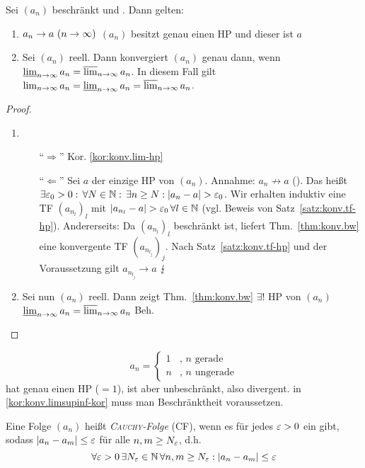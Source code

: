 \documentclass[12pt]{scrreprt}
\begin{document}
\begin{kor}
  \label{kor:konv.limsupinf-kor}
  Sei $(a_n)$ beschränkt und . Dann gelten:
  \begin{enumerate}
  \item \label{kor:konv.limsupinf-kor.a} $a_n\to a\ (n\rightarrow\infty)$ \gdw
    $(a_n)$ besitzt genau einen HP und dieser ist $a$
  \item \label{kor:konv.limsupinf-kor.b} Sei $(a_n)$ reell. Dann
    konvergiert $(a_n)$ genau dann, wenn
    $\varliminf_{n\rightarrow\infty}{a_n}=\varlimsup_{n\rightarrow\infty}{a_n}$. In diesem Fall gilt
    $\lim_{n\rightarrow\infty}{a_n}=\varliminf_{n\rightarrow\infty}{a_n}=\varlimsup_{n\rightarrow\infty}{a_n}$.
  \end{enumerate}
\end{kor}
\begin{proof}
  \begin{enumerate}
  \item
    \begin{enumerate}
    \item["`$\Rightarrow$"'] Kor. \ref{kor:konv.lim-hp}
    \item["`$\Leftarrow$"'] Sei $a$ der einzige HP von
      $(a_n)$. Annahme: $a_n\not\to a$ (\ninf). Das heißt $\exists
      \varepsilon_0>0:\,\forall N\in\mathbb{N}:\,\exists n\ge N:
      \left\lvert a_n-a\right\lvert>\varepsilon_0$. Wir erhalten induktiv eine TF $(a_{n_l})_l$
      mit $\left\lvert a_{n_l}-a\right\lvert>\varepsilon_0\,\forall l\in\mathbb{N}$ (vgl. Beweis von
      Satz~\ref{satz:konv.tf-hp}). Andererseits: Da $(a_{n_l})_l$
      beschränkt ist, liefert Thm.~\ref{thm:konv.bw} eine konvergente
      TF $(a_{n_{l_j}})_j$. Nach Satz~\ref{satz:konv.tf-hp} und der
      Voraussetzung gilt $a_{n_{l_j}}\to a$ $\lightning$
    \end{enumerate}
  \item Sei nun $(a_n)$ reell. Dann zeigt Thm.~\ref{thm:konv.bw}
    $\exists!$ HP von $(a_n)$ \gdw $\varliminf_{n\rightarrow\infty}{a_n}=\varlimsup_{n\rightarrow\infty}{a_n}$
     Beh.
  \end{enumerate}
\end{proof}

\begin{bem*}
  \[ a_n = 
  \begin{cases}
    1&\text{, } n \text{ gerade} \\
    n&\text{, } n \text{ ungerade}
  \end{cases}
  \] hat genau einen HP ($=1$), ist aber unbeschränkt, also
  divergent. \folgt in \ref{kor:konv.limsupinf-kor} muss man Beschränktheit voraussetzen.
\end{bem*}

\begin{dfn}
  \label{dfn:konv.cauchyfolge}
  Eine Folge $(a_n)$ heißt \emph{\textsc{Cauchy}-Folge} (CF), wenn es für jedes
  $\varepsilon>0$ ein  gibt, sodass $\left\lvert a_n-a_m\right\lvert\le\varepsilon$ für alle
  $n, m \ge N_\varepsilon$, d.h.
  \[\forall \varepsilon>0\, \exists N_\varepsilon\in\mathbb{N}\, \forall n, m \ge N_\varepsilon: \left\lvert a_n-a_m\right\lvert\le\varepsilon\]
\end{dfn}
\end{document}
